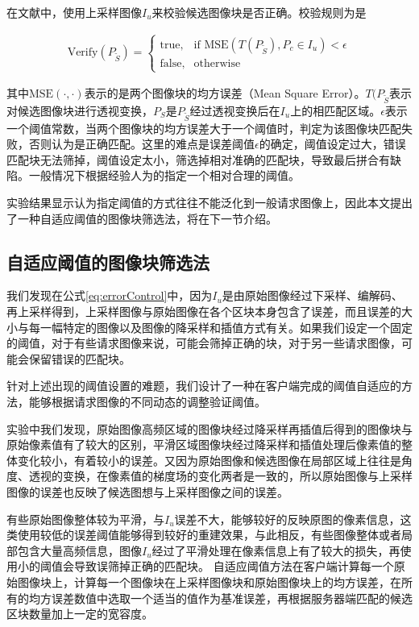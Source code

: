 在文献\cite{Dai:2012vn}中，使用上采样图像\(I_u\)来校验候选图像块是否正确。校验规则为是

\begin{align}
\label{eq:errorControl}
  \text{Verify}(P_{\tilde{S}}) = 
\begin{cases} 
\text{true}, & \mbox{if MSE} (T(P_{\tilde{S}}),P_c \in I_u) < \epsilon \\
\text{false}, & \mbox{otherwise}
\end{cases}
\end{align}

其中\(\text{MSE}(\cdot,\cdot)\)表示的是两个图像块的均方误差（Mean Square Error）。\(T(P_{\tilde{S}}\)表示对候选图像块进行透视变换，\(P_{S}\)是\(P_{\tilde{S}}\)经过透视变换后在\(I_u\)上的相匹配区域。\(\epsilon\)表示一个阈值常数，当两个图像块的均方误差大于一个阈值时，判定为该图像块匹配失败，否则认为是正确匹配。这里的难点是误差阈值\(\epsilon\)的确定，阈值设定过大，错误匹配块无法筛掉，阈值设定太小，筛选掉相对准确的匹配块，导致最后拼合有缺陷。一般情况下根据经验人为的指定一个相对合理的阈值。

实验结果显示认为指定阈值的方式往往不能泛化到一般请求图像上，因此本文提出了一种自适应阈值的图像块筛选法，将在下一节介绍。

\subsection{自适应阈值的图像块筛选法}

我们发现在公式\ref{eq:errorControl}中，因为\(I_u\)是由原始图像经过下采样、编解码、再上采样得到，上采样图像与原始图像在各个区块本身包含了误差，而且误差的大小与每一幅特定的图像以及图像的降采样和插值方式有关。如果我们设定一个固定的阈值，对于有些请求图像来说，可能会筛掉正确的块，对于另一些请求图像，可能会保留错误的匹配块。

针对上述出现的阈值设置的难题，我们设计了一种在客户端完成的阈值自适应的方法，能够根据请求图像的不同动态的调整验证阈值。

实验中我们发现，原始图像高频区域的图像块经过降采样再插值后得到的图像块与原始像素值有了较大的区别，平滑区域图像块经过降采样和插值处理后像素值的整体变化较小，有着较小的误差。又因为原始图像和候选图像在局部区域上往往是角度、透视的变换，在像素值的梯度场的变化两者是一致的，所以原始图像与上采样图像的误差也反映了候选图想与上采样图像之间的误差。

有些原始图像整体较为平滑，与\(I_u\)误差不大，能够较好的反映原图的像素信息，这类使用较低的误差阈值能够得到较好的重建效果，与此相反，有些图像整体或者局部包含大量高频信息，图像\(I_u\)经过了平滑处理在像素信息上有了较大的损失，再使用小的阈值会导致误筛掉正确的匹配块。
自适应阈值方法在客户端计算每一个原始图像块上，计算每一个图像块在上采样图像块和原始图像块上的均方误差，在所有的均方误差数值中选取一个适当的值作为基准误差，再根据服务器端匹配的候选区块数量加上一定的宽容度。

